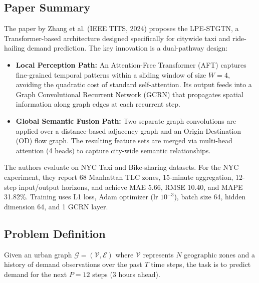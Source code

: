 \documentclass{rapportECL}
\begin{document}
\subsection{Paper Summary}
The paper by Zhang et al. (IEEE TITS, 2024) proposes the LPE-STGTN, a Transformer-based architecture designed specifically for citywide taxi and ride-hailing demand prediction. The key innovation is a dual-pathway design:

\begin{itemize}[leftmargin=*]
    \item \textbf{Local Perception Path:} An Attention-Free Transformer (AFT) captures fine-grained temporal patterns within a sliding window of size $W{=}4$, avoiding the quadratic cost of standard self-attention. Its output feeds into a Graph Convolutional Recurrent Network (GCRN) that propagates spatial information along graph edges at each recurrent step.
    \item \textbf{Global Semantic Fusion Path:} Two separate graph convolutions are applied over a distance-based adjacency graph and an Origin-Destination (OD) flow graph. The resulting feature sets are merged via multi-head attention (4 heads) to capture city-wide semantic relationships.
\end{itemize}

The authors evaluate on NYC Taxi and Bike-sharing datasets. For the NYC experiment, they report 68 Manhattan TLC zones, 15-minute aggregation, 12-step input/output horizons, and achieve MAE 5.66, RMSE 10.40, and MAPE 31.82\%. Training uses L1 loss, Adam optimizer (lr $10^{-3}$), batch size 64, hidden dimension 64, and 1 GCRN layer.

\subsection{Problem Definition}
Given an urban graph $\mathcal{G} = (\mathcal{V}, \mathcal{E})$ where $\mathcal{V}$ represents $N$ geographic zones and a history of demand observations over the past $T$ time steps, the task is to predict demand for the next $P{=}12$ steps (3 hours ahead).
\end{document}
